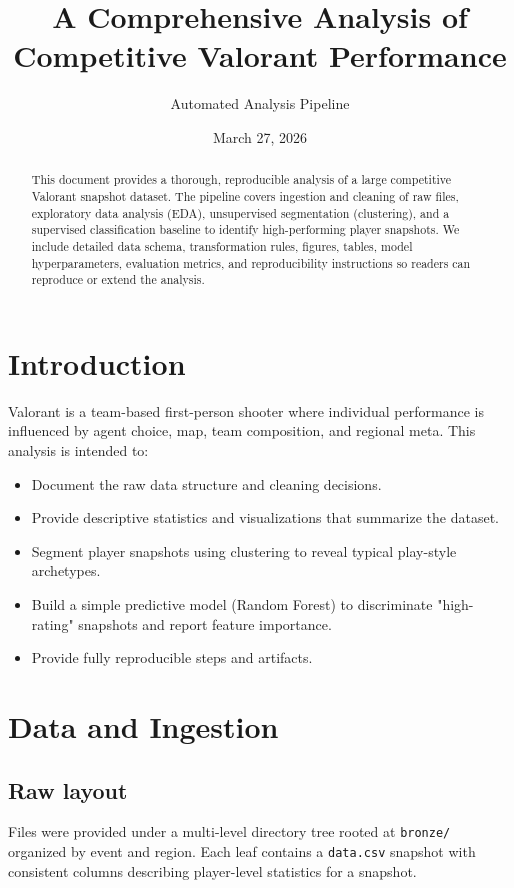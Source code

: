 \documentclass[11pt]{article}
\title{A Comprehensive Analysis of Competitive Valorant Performance}
\author{Automated Analysis Pipeline}
\date{March 27, 2026}
\begin{document}
\maketitle

\begin{abstract}
This document provides a thorough, reproducible analysis of a large competitive Valorant snapshot dataset. The pipeline covers ingestion and cleaning of raw files, exploratory data analysis (EDA), unsupervised segmentation (clustering), and a supervised classification baseline to identify high-performing player snapshots. We include detailed data schema, transformation rules, figures, tables, model hyperparameters, evaluation metrics, and reproducibility instructions so readers can reproduce or extend the analysis.
\end{abstract}

\tableofcontents
\clearpage

\section{Introduction}
Valorant is a team-based first-person shooter where individual performance is influenced by agent choice, map, team composition, and regional meta. This analysis is intended to:
\begin{itemize}
  \item Document the raw data structure and cleaning decisions.
  \item Provide descriptive statistics and visualizations that summarize the dataset.
  \item Segment player snapshots using clustering to reveal typical play-style archetypes.
  \item Build a simple predictive model (Random Forest) to discriminate "high-rating" snapshots and report feature importance.
  \item Provide fully reproducible steps and artifacts.
\end{itemize}

\section{Data and Ingestion}
\subsection{Raw layout}
Files were provided under a multi-level directory tree rooted at \texttt{bronze/} organized by event and region. Each leaf contains a \texttt{data.csv} snapshot with consistent columns describing player-level statistics for a snapshot.
\end{document}
